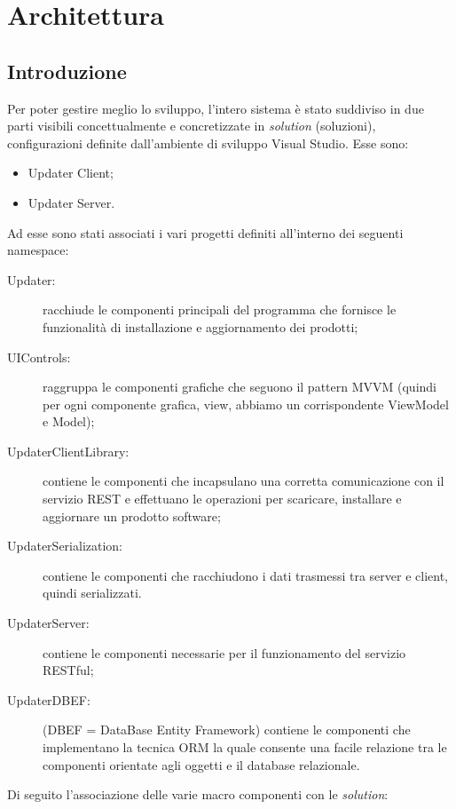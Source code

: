 \documentclass[../RelazioneFinale.tex]{subfiles}
\begin{document}
	\chapter{Architettura}
	\label{cap:Architettura}
	
		\section{Introduzione}
			Per poter gestire meglio lo sviluppo, l'intero sistema è stato suddiviso in due parti visibili concettualmente e concretizzate in \emph{solution} (soluzioni), configurazioni definite dall'ambiente di sviluppo Visual Studio. Esse sono:
			\begin{itemize}
				\item Updater Client;
				\item Updater Server.
			\end{itemize}
			Ad esse sono stati associati i vari progetti definiti all'interno dei seguenti namespace:
			\begin{description}
				\item[Updater:] racchiude le componenti principali del programma che fornisce le funzionalità di installazione e aggiornamento dei prodotti;
				\item[UIControls:] raggruppa le componenti grafiche che seguono il pattern MVVM (quindi per ogni componente grafica, view, abbiamo un corrispondente ViewModel e Model);
				\item[UpdaterClientLibrary:] contiene le componenti che incapsulano una corretta comunicazione con il servizio REST e effettuano le operazioni per scaricare, installare e aggiornare un prodotto software;
				\item[UpdaterSerialization:] contiene le componenti che racchiudono i dati trasmessi tra server e client, quindi serializzati.
				\item[UpdaterServer:] contiene le componenti necessarie per il funzionamento del servizio RESTful;
				\item[UpdaterDBEF:] (DBEF = DataBase Entity Framework) contiene le componenti che implementano la tecnica ORM la quale consente una facile relazione tra le componenti orientate agli oggetti e il database relazionale.
 			\end{description}
 			Di seguito l'associazione delle varie macro componenti con le \emph{solution}:
\end{document}
